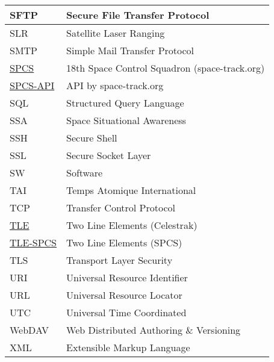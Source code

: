 \documentclass[dec_sum_main.tex]{subfiles}
\begin{document}
\begin{longtable}{|m{2.8cm}|m{10cm}|}
	SFTP & Secure File Transfer Protocol \\ \hline
	SLR & Satellite Laser Ranging \\ \hline
	SMTP & Simple Mail Transfer Protocol \\ \hline
	\href{https://www.space-track.org/}{SPCS} & 18th Space Control Squadron (space-track.org) \\ \hline
	\href{https://www.space-track.org/documentation#/api}{SPCS-API} & API by space-track.org \\ \hline
	SQL & Structured Query Language \\ \hline
	SSA & Space Situational Awareness \\ \hline
	SSH & Secure Shell \\ \hline
	SSL & Secure Socket Layer \\ \hline
	SW & Software \\ \hline
	TAI & Temps Atomique International \\ \hline
	TCP & Transfer Control Protocol \\ \hline
    \href{https://www.celestrak.com/NORAD/documentation/tle-fmt.php}{TLE} & Two Line Elements (Celestrak)\\ \hline    
	\href{https://www.space-track.org/documentation#tle}{TLE-SPCS} & Two Line Elements (SPCS)\\ \hline
	TLS & Transport Layer Security \\ \hline
	URI & Universal Resource Identifier \\ \hline
	URL & Universal Resource Locator \\ \hline
	UTC & Universal Time Coordinated \\ \hline
	WebDAV & Web Distributed Authoring \& Versioning \\ \hline
	XML & Extensible Markup Language \\ \hline						
\end{longtable}
\end{document}

